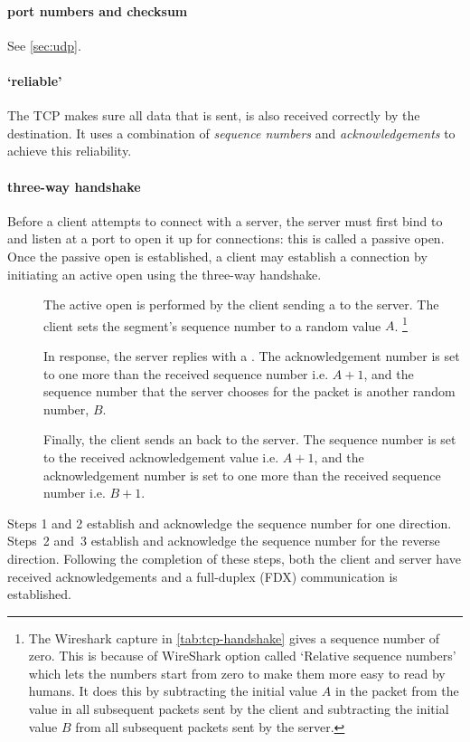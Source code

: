 \paragraph{port numbers and checksum}
See \cref{sec:udp}.

\paragraph{`reliable'}
The \ac{TCP} makes sure all data that is sent, is also received correctly by the destination.
It uses a combination of \emph{sequence numbers} and \emph{acknowledgements} to achieve this reliability.

\paragraph{three-way handshake}
Before a client attempts to connect with a server, the server must first bind to and listen at a port to open it up for connections: this is called a passive open.
Once the passive open is established, a client may establish a connection by initiating an active open using the three-way handshake.%

\begin{marginfigure}
\caption{The three-way handshake}
\label{fig:transport-three-way-handshake}
\end{marginfigure}

\begin{description}
\item[]
The active open is performed by the client sending a  to the server.
The client sets the segment's sequence number to a random value $A$.%
    \footnote{%
        The Wireshark capture in \cref{tab:tcp-handshake} gives a sequence number of zero.
        This is because of WireShark option called `Relative sequence numbers' which lets the numbers start from zero to make them more easy to read by humans.
        It does this by subtracting the initial value $A$ in the  packet from the value in all subsequent packets sent by the client and subtracting the initial value $B$ from all subsequent packets sent by the server.
        }
\item[]
In response, the server replies with a .
The acknowledgement number is set to one more than the received sequence number i.e. $A+1$, and the sequence number that the server chooses for the packet is another random number, $B$.
\item[]
Finally, the client sends an  back to the server.
The sequence number is set to the received acknowledgement value i.e. $A+1$, and the acknowledgement number is set to one more than the received sequence number i.e. $B+1$.
\end{description}
Steps 1 and 2 establish and acknowledge the sequence number for one direction.
Steps~2 and~3 establish and acknowledge the sequence number for the reverse direction.
Following the completion of these steps, both the client and server have received acknowledgements and a full-duplex (\acs{FDX}) communication is established.


